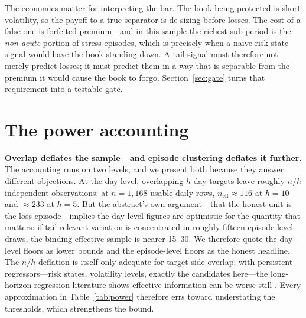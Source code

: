 \documentclass[11pt]{article}
\begin{document}
The economics matter for interpreting the bar. The book being protected is short volatility, so
the payoff to a true separator is de-sizing before losses. The cost of a false one is forfeited
premium---and in this sample the richest sub-period is the \emph{non-acute} portion of stress
episodes, which is precisely when a naive risk-state signal would have the book standing down.
A tail signal must therefore not merely predict losses; it must predict them in a way that is
separable from the premium it would cause the book to forgo. Section~\ref{sec:gate} turns that
requirement into a testable gate.

\section{The power accounting}\label{sec:power}
\textbf{Overlap deflates the sample---and episode clustering deflates it further.} The
accounting runs on two levels, and we present both because they answer different objections.
At the day level, overlapping $h$-day targets leave roughly $n/h$ independent observations: at
$n = 1{,}168$ usable daily rows, $n_{\mathrm{eff}} \approx 116$ at $h = 10$ and $\approx 233$
at $h = 5$. But the abstract's own argument---that the honest unit is the loss episode---implies
the day-level figures are optimistic for the quantity that matters: if tail-relevant variation
is concentrated in roughly fifteen episode-level draws, the binding effective sample is nearer
15--30. We therefore quote the day-level floors as lower bounds and the episode-level floors as
the honest headline. The $n/h$ deflation is itself only adequate for target-side overlap: with
persistent regressors---risk states, volatility levels, exactly the candidates here---the
long-horizon regression literature shows effective information can be worse still
\citep{valk, brw}. Every approximation in Table~\ref{tab:power} therefore errs toward
understating the thresholds, which strengthens the bound.
\end{document}
